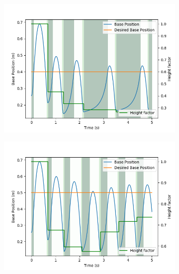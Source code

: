 \documentclass[onecolumn, letter paper]{report}
\begin{document}
\begin{figure}[htb!]
    \centering
    \begin{subfigure}{.49\textwidth}
    \centering
    \includegraphics[width=\textwidth]{figures/sim0.4m/base_position.png}
    \end{subfigure}
    \begin{subfigure}{.49\textwidth}
    \centering
    \includegraphics[width=\textwidth]{figures/sim0.5m/base_position.png}
    \end{subfigure}
    \begin{subfigure}{.49\textwidth}
    \centering

\end{subfigure}
\end{figure}
\end{document}
